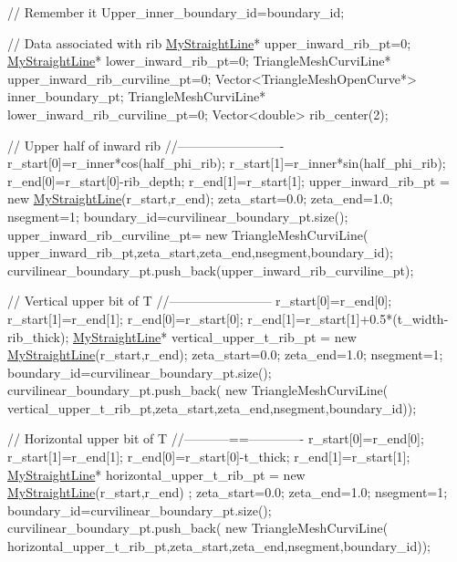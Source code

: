 \begin{DoxyCodeInclude}
  \textcolor{comment}{// Remember it}
  Upper\_inner\_boundary\_id=boundary\_id;

  \textcolor{comment}{// Data associated with rib}
  \hyperlink{classMyStraightLine}{MyStraightLine}* upper\_inward\_rib\_pt=0;
  \hyperlink{classMyStraightLine}{MyStraightLine}* lower\_inward\_rib\_pt=0;
  TriangleMeshCurviLine* upper\_inward\_rib\_curviline\_pt=0;
  Vector<TriangleMeshOpenCurve*> inner\_boundary\_pt;
  TriangleMeshCurviLine* lower\_inward\_rib\_curviline\_pt=0;
  Vector<double> rib\_center(2);

  \textcolor{comment}{// Upper half of inward rib}
  \textcolor{comment}{//-------------------------}
  r\_start[0]=r\_inner*cos(half\_phi\_rib);
  r\_start[1]=r\_inner*sin(half\_phi\_rib);
  r\_end[0]=r\_start[0]-rib\_depth;
  r\_end[1]=r\_start[1];
  upper\_inward\_rib\_pt = \textcolor{keyword}{new} \hyperlink{classMyStraightLine}{MyStraightLine}(r\_start,r\_end);
  zeta\_start=0.0;
  zeta\_end=1.0;
  nsegment=1;
  boundary\_id=curvilinear\_boundary\_pt.size();
  upper\_inward\_rib\_curviline\_pt=
   \textcolor{keyword}{new} TriangleMeshCurviLine(
    upper\_inward\_rib\_pt,zeta\_start,zeta\_end,nsegment,boundary\_id);
  curvilinear\_boundary\_pt.push\_back(upper\_inward\_rib\_curviline\_pt);

  \textcolor{comment}{// Vertical upper bit of T}
  \textcolor{comment}{//------------------------}
  r\_start[0]=r\_end[0];
  r\_start[1]=r\_end[1];
  r\_end[0]=r\_start[0];
  r\_end[1]=r\_start[1]+0.5*(t\_width-rib\_thick);
  \hyperlink{classMyStraightLine}{MyStraightLine}* vertical\_upper\_t\_rib\_pt = \textcolor{keyword}{new} \hyperlink{classMyStraightLine}{MyStraightLine}(r\_start,r\_end);
  zeta\_start=0.0;
  zeta\_end=1.0;
  nsegment=1;
  boundary\_id=curvilinear\_boundary\_pt.size();
  curvilinear\_boundary\_pt.push\_back(
   \textcolor{keyword}{new} TriangleMeshCurviLine(
    vertical\_upper\_t\_rib\_pt,zeta\_start,zeta\_end,nsegment,boundary\_id));


  \textcolor{comment}{// Horizontal upper bit of T}
  \textcolor{comment}{//-----------==-------------}
  r\_start[0]=r\_end[0];
  r\_start[1]=r\_end[1];
  r\_end[0]=r\_start[0]-t\_thick;
  r\_end[1]=r\_start[1];
  \hyperlink{classMyStraightLine}{MyStraightLine}* horizontal\_upper\_t\_rib\_pt = \textcolor{keyword}{new} \hyperlink{classMyStraightLine}{MyStraightLine}(r\_start,r\_end)
      ;
  zeta\_start=0.0;
  zeta\_end=1.0;
  nsegment=1;
  boundary\_id=curvilinear\_boundary\_pt.size();
  curvilinear\_boundary\_pt.push\_back(
   \textcolor{keyword}{new} TriangleMeshCurviLine(
    horizontal\_upper\_t\_rib\_pt,zeta\_start,zeta\_end,nsegment,boundary\_id));


\end{DoxyCodeInclude}
